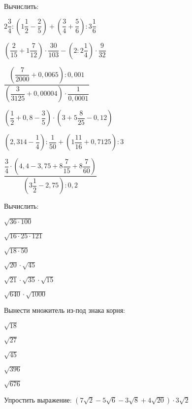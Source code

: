 \documentclass[12pt, a4paper]{article}
\begin{document}
	\begin{enumcols}[label=\textbf{\arabic*.}]
		\item Вычислить:
		\begin{enumcols}[itemcolumns=2]
			\item \( 2\dfrac{3}{4}:\left( 1\dfrac{1}{2}-\dfrac{2}{5} \right)+\left( \dfrac{3}{4}+\dfrac{5}{6} \right):3\dfrac{1}{6} \)
			\item \( \left( \dfrac{2}{15}+1\dfrac{7}{12} \right)\cdot\dfrac{30}{103}-\left( 2:2\dfrac{1}{4} \right)\cdot\dfrac{9}{32} \)
			\item \( \dfrac{\left( \dfrac{7}{2000}+0,0065 \right):0,001}{\left( \dfrac{3}{3125}+0,00004 \right)\cdot\dfrac{1}{0,0001}} \)
			\item \( \left( \dfrac{1}{2}+0,8-\dfrac{3}{5}\right)\cdot\left( 3+5\dfrac{8}{25}-0,12 \right) \)
			\item \( \left( 2,314-\dfrac{1}{4} \right):\dfrac{1}{50}+\left( 1\dfrac{11}{16}+0,7125 \right):3 \)
			\item \( \dfrac{\dfrac{3}{4}\cdot\left( 4,4-3,75+8\dfrac{7}{15}+8\dfrac{7}{60} \right)}{\left( 3\dfrac{1}{2}-2,75 \right):0,2} \)
		\end{enumcols}
		\item Вычислить:
		\begin{enumcols}[itemcolumns=4]
			\item \( \sqrt{36\cdot100} \)
			\item \( \sqrt{16\cdot25\cdot121} \)
			\item \( \sqrt{18\cdot50} \)
			\item \( \sqrt{20}\cdot\sqrt{45} \)
			\item \( \sqrt{21}\cdot\sqrt{35}\cdot\sqrt{15} \)
			\item \( \sqrt{640}\cdot\sqrt{1000} \)
		\end{enumcols}
		\item Вынести множитель из-под знака корня:
		\begin{enumcols}[itemcolumns=5]
			\item \( \sqrt{18} \)
			\item \( \sqrt{27} \)
			\item \( \sqrt{45} \)
			\item \( \sqrt{396} \)
			\item \( \sqrt{676} \)
		\end{enumcols}
		\item Упростить выражение: \( (7\sqrt{2}-5\sqrt{6}-3\sqrt{8}+4\sqrt{20})\cdot3\sqrt{2} \)
	\end{enumcols}
\end{document}
